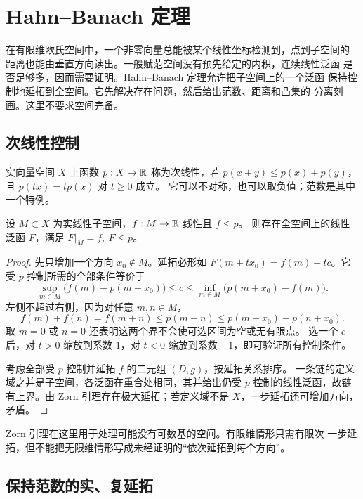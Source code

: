 \chapter{Hahn--Banach 定理}
\label{chap:hahn-banach}

在有限维欧氏空间中，一个非零向量总能被某个线性坐标检测到，点到子空间的
距离也能由垂直方向读出。一般赋范空间没有预先给定的内积，连续线性泛函
是否足够多，因而需要证明。Hahn--Banach 定理允许把子空间上的一个泛函
保持控制地延拓到全空间。它先解决存在问题，然后给出范数、距离和凸集的
分离刻画。这里不要求空间完备。

\section{次线性控制}

实向量空间 \(X\) 上函数 \(p:X\to\mathbb{R}\) 称为次线性，若
\(p(x+y)\le p(x)+p(y)\)，且 \(p(tx)=tp(x)\) 对 \(t\ge0\) 成立。
它可以不对称，也可以取负值；范数是其中一个特例。

\begin{theorem}\label{thm:hahn-banach-real}
设 \(M\subset X\) 为实线性子空间，\(f:M\to\mathbb{R}\) 线性且 \(f\le p\)。
则存在全空间上的线性泛函 \(F\)，满足 \(F|_M=f,\ F\le p\)。
\end{theorem}
\begin{proof}
先只增加一个方向 \(x_0\notin M\)。延拓必形如
\(F(m+tx_0)=f(m)+tc\)。它受 \(p\) 控制所需的全部条件等价于
\[
 \sup_{m\in M}\bigl(f(m)-p(m-x_0)\bigr)
 \le c\le
 \inf_{m\in M}\bigl(p(m+x_0)-f(m)\bigr).
\]
左侧不超过右侧，因为对任意 \(m,n\in M\)，
\[
 f(m)+f(n)=f(m+n)\le p(m+n)
 \le p(m-x_0)+p(n+x_0).
\]
取 \(m=0\) 或 \(n=0\) 还表明这两个界不会使可选区间为空或无有限点。
选一个 \(c\) 后，对 \(t>0\) 缩放到系数 \(1\)，对 \(t<0\) 缩放到系数
\(-1\)，即可验证所有控制条件。

考虑全部受 \(p\) 控制并延拓 \(f\) 的二元组 \((D,g)\)，按延拓关系排序。
一条链的定义域之并是子空间，各泛函在重合处相同，其并给出仍受 \(p\)
控制的线性泛函，故链有上界。由 Zorn 引理存在极大延拓；若定义域不是
\(X\)，一步延拓还可增加方向，矛盾。
\end{proof}

Zorn 引理在这里用于处理可能没有可数基的空间。有限维情形只需有限次
一步延拓，但不能把无限维情形写成未经证明的“依次延拓到每个方向”。

\section{保持范数的实、复延拓}

